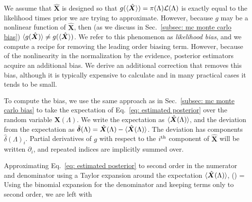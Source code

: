 \documentclass[%
 reprint,
 amsmath,amssymb,
 aps,nofootinbib,nobibnotes,onecolumn,prd
]{revtex4-2}
\begin{document}
We assume that $\hat{\bm X}$ is designed so that $g(\langle \hat{\bm X}\rangle) = \pi(\Lambda)\mathcal{L}(\Lambda)$ is exactly equal to the likelihood times prior we are trying to approximate. However, because $g$ may be a nonlinear function of $\hat{\bm X}$, then (as we discuss in Sec.~\ref{subsec: mc monte carlo bias}) $\langle g(\hat{\bm X})\rangle \neq g(\langle \hat{\bm X}\rangle)$. We refer to this phenomenon as \textit{likelihood bias}, and we compute a recipe for removing the leading order biasing term. However, because of the nonlinearity in the normalization by the evidence, posterior estimators acquire an additional bias. We derive an additional correction that removes this bias, although it is typically expensive to calculate and in many practical cases it tends to be small.

To compute the bias, we use the same approach as in Sec.~\ref{subsec: mc monte carlo bias} to take the expectation of Eq.~\ref{eq: estimated posterior} over the random variable $\hat{\bm X}(\Lambda)$. We write the expectation as $\langle \hat{\bm X}(\Lambda)\rangle$, and the deviation from the expectation as $\hat{\bm \delta}(\Lambda) = \hat{\bm X}(\Lambda) - \langle \hat{\bm X}(\Lambda)\rangle$. The deviation has components $\hat{\delta}(\Lambda)_i$. Partial derivatives of $g$ with respect to the $i^{\rm th}$ component of $\hat{\bm X}$ will be written $\partial_i$, and repeated indices are implicitly summed over. 

Approximating Eq.~\ref{eq: estimated posterior} to second order in the numerator and denominator using a Taylor expansion around the expectation $\langle \hat{\bm X}(\Lambda)\rangle$,
\beq
{}(\Lambda) =  
\eeq
Using the binomial expansion for the denominator and keeping terms only to second order, we are left with
\end{document}
